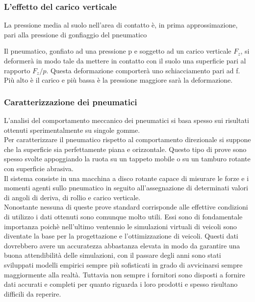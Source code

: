 \subsubsection{L'effetto del carico verticale}
La pressione media al suolo nell’area di contatto è, in prima approssimazione,
pari alla pressione di gonfiaggio del pneumatico

Il pneumatico, gonfiato ad una pressione p e soggetto ad un carico verticale $F_z$, si deformerà in modo tale da mettere in contatto con il suolo una superficie pari al rapporto $F_z / p$.
Questa deformazione comporterà uno schiacciamento pari ad f.
Più alto è il carico e più bassa è la pressione maggiore sarà la deformazione.

\subsubsection{Caratterizzazione dei pneumatici}
L'analisi del comportamento meccanico dei pneumatici si basa spesso sui risultati ottenuti sperimentalmente su singole gomme.\\
Per caratterizzare il pneumatico rispetto al comportamento direzionale si suppone che la superficie sia perfettamente piana e orizzontale.
Questo tipo di prove sono spesso svolte appoggiando la ruota su un tappeto mobile o su un tamburo rotante con superficie abrasiva.\\
Il sistema consiste in una macchina a disco rotante capace di misurare le forze e i momenti
agenti sullo pneumatico in seguito all’assegnazione di determinati valori di angoli di deriva,
di rollio e carico verticale.\\
Nonostante nessuna di queste prove standard corrisponde alle effettive condizioni di utilizzo i dati ottenuti sono comunque molto utili.
Essi sono di fondamentale importanza poichè nell'ultimo ventennio le simulazioni virtuali di veicoli sono diventate la base per la progettazione e l'ottimizzazione di veicoli.
Questi dati dovrebbero avere un accuratezza abbastanza elevata in modo da garantire una buona attendibilità delle simulazioni, con il passare degli anni sono stati sviluppati modelli empirici sempre più sofisticati in grado di avvicinarsi sempre maggiormente alla realtà.
Tuttavia non sempre i fornitori sono disposti a fornire dati accurati e completi per quanto riguarda i loro prodotti e spesso risultano difficili da reperire.

